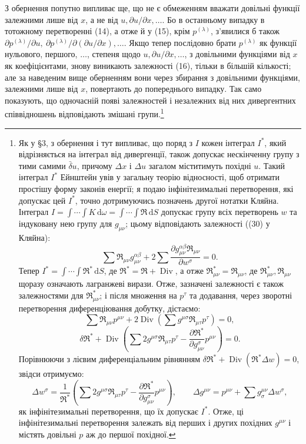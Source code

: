 \documentclass[11pt]{article}
\providecommand{\D}{\Delta}
\providecommand{\p}{\partial}
\providecommand{\dd}{\mathrm d}
\DeclareMathOperator{\Div}{Div}
\providecommand{\bd}{\bar{\delta}}
\begin{document}
З обернення попутно випливає ще, що не є обмеженням вважати довільні функції залежними лише від \(x\), а не від \(u,\p u/\p x,\ldots\). Бо в останньому випадку в тотожному перетворенні (14), а отже й у (15), крім \(p^{(\lambda)}\), з'явилися б також \(\p p^{(\lambda)}/\p u,\ \p p^{(\lambda)}/\p(\p u/\p x),\ldots\). Якщо тепер послідовно брати \(p^{(\lambda)}\) як функції нульового, першого, \(\ldots\), степеня щодо \(u,\p u/\p x,\ldots\), з довільними функціями від \(x\) як коефіцієнтами, знову виникають залежності (16), тільки в більшій кількості; але за наведеним вище оберненням вони через збирання з довільними функціями, залежними лише від \(x\), повертають до попереднього випадку. Так само показують, що одночасній появі залежностей і незалежних від них дивергентних співвідношень відповідають змішані групи.\footnote{Як у \S{}3, з обернення і тут випливає, що поряд з \(I\) кожен інтеграл \(I^*\), який відрізняється на інтеграл від дивергенції, також допускає нескінченну групу з тими самими \(\bd u\), причому \(\D x\) і \(\D u\) загалом міститимуть похідні \(u\). Такий інтеграл \(I^*\) Ейнштейн увів у загальну теорію відносності, щоб отримати простішу форму законів енергії; я подаю інфінітезимальні перетворення, які допускає цей \(I^*\), точно дотримуючись позначень другої нотатки Кляйна. Інтеграл \(I=\int\!\cdots\!\int K\,\dd\omega=\int\!\cdots\!\int \mathfrak{R}\,\dd S\) допускає групу всіх перетворень \(w\) та індуковану нею групу для \(g_{\mu\nu}\); цьому відповідають залежності ((30) у Кляйна):
\[
\sum \mathfrak{R}_{\mu\nu}g_{\mu\nu}^{\alpha\beta}
+2\sum\frac{\p g_{\mu\nu}^{\alpha\beta}\mathfrak{R}_{\mu\nu}}{\p w^\sigma}=0.
\]
Тепер \(I^*=\int\!\cdots\!\int \mathfrak{R}^*\,\dd S\), де \(\mathfrak{R}^*=\mathfrak{R}+\Div\), а отже \(\mathfrak{R}_{\mu\nu}^*=\mathfrak{R}_{\mu\nu}\), де \(\mathfrak{R}_{\mu\nu}^*,\mathfrak{R}_{\mu\nu}\) щоразу означають лагранжеві вирази. Отже, зазначені залежності є також залежностями для \(\mathfrak{R}_{\mu\nu}^*\); і після множення на \(p^\tau\) та додавання, через зворотні перетворення диференціювання добутку, дістаємо:
\[
\sum \mathfrak{R}_{\mu\nu}p^{\mu\nu}
+2\Div\!\left(\sum g^{\mu\sigma}\mathfrak{R}_{\mu\tau}p^\tau\right)=0,
\]
\[
\delta\mathfrak{R}^*+\Div\!\left(\sum 2g^{\mu\sigma}\mathfrak{R}_{\mu\tau}p^\tau
-\frac{\p\mathfrak{R}^*}{\p g_{\mu\nu}^{\sigma}}p^{\mu\nu}\right)=0.
\]
Порівнюючи з лієвим диференціальним рівнянням \(\delta\mathfrak{R}^*+\Div(\mathfrak{R}^*\D w)=0\), звідси отримуємо:
\[
\D w^\sigma=\frac1{\mathfrak{R}^*}\left(\sum 2g^{\mu\sigma}\mathfrak{R}_{\mu\tau}p^\tau
-\frac{\p\mathfrak{R}^*}{\p g_{\mu\nu}^{\sigma}}p^{\mu\nu}\right),
\qquad
\D g^{\mu\nu}=p^{\mu\nu}+\sum g^{\mu\nu}_{\sigma}\D w^\sigma,
\]
як інфінітезимальні перетворення, що їх допускає \(I^*\). Отже, ці інфінітезимальні перетворення залежать від перших і других похідних \(g^{\mu\nu}\) і містять довільні \(p\) аж до першої похідної.}
\end{document}
